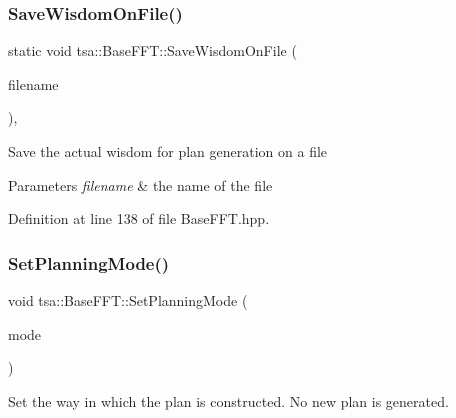 \mbox{\label{classtsa_1_1_base_f_f_t_a1f5332f508749018f0c6a58c9b1ed9dc}} 
\subsubsection{\texorpdfstring{Save\+Wisdom\+On\+File()}{SaveWisdomOnFile()}}
{\footnotesize\ttfamily static void tsa\+::\+Base\+F\+F\+T\+::\+Save\+Wisdom\+On\+File (\begin{DoxyParamCaption}\item[{std\+::string}]{filename }\end{DoxyParamCaption})\hspace{0.3cm}{\ttfamily [inline]}, {\ttfamily [static]}}

Save the actual wisdom for plan generation on a file


\begin{DoxyParams}{Parameters}
{\em filename} & the name of the file \\
\hline
\end{DoxyParams}


Definition at line 138 of file Base\+F\+F\+T.\+hpp.

\mbox{\label{classtsa_1_1_base_f_f_t_a4a8b00feb20dc3ace768d3c851143a03}} 
\subsubsection{\texorpdfstring{Set\+Planning\+Mode()}{SetPlanningMode()}}
{\footnotesize\ttfamily void tsa\+::\+Base\+F\+F\+T\+::\+Set\+Planning\+Mode (\begin{DoxyParamCaption}\item[{enum \hyperlink{namespacetsa_a217e07ef78939f88b22c8428ac96b1ae}{F\+F\+T\+Planning\+Mode}}]{mode }\end{DoxyParamCaption})\hspace{0.3cm}{\ttfamily [inline]}}

Set the way in which the plan is constructed. No new plan is generated.


